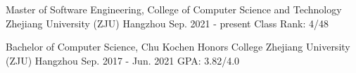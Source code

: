 \begin{cventries}

	\cventry
	{Master of Software Engineering, College of Computer Science and Technology} %
	{Zhejiang University (ZJU)} %
	{Hangzhou} %
	{Sep. 2021 - present} %
	{
		Class Rank: 4/48
	}%
	\vspace{1mm}

	\cventry
	{Bachelor of Computer Science, Chu Kochen Honors College} %
	{Zhejiang University (ZJU)} %
	{Hangzhou} %
	{Sep. 2017 - Jun. 2021} %
	{
		GPA: 3.82/4.0
	}%
	\vspace{1mm}
\end{cventries}
